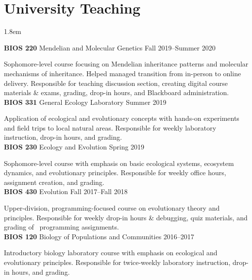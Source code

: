 \documentclass[]{article}
\begin{document}
\section{University Teaching}

\vspace{4mm}
\leftskip 1.8em

\textbf{BIOS 220} Mendelian and Molecular Genetics \hfill Fall 2019--Summer 2020
     
Sophomore-level course focusing on Mendelian inheritance patterns and molecular mechanisms of \linebreak inheritance. Helped managed transition from in-person to online delivery. Responsible for teaching discussion section, creating digital course materials \& exams, grading, drop-in hours, and Blackboard \linebreak administration. \href{https://ledelaney.org/teaching/genetics220/}{\faLink} \href{https://github.com/ledelaney/Genetics220}{\faGithub}\\
     
\textbf{BIOS 331} General Ecology Laboratory \hfill Summer 2019

Application of ecological and evolutionary concepts with hands-on experiments and field trips to local natural areas. Responsible for weekly laboratory instruction, drop-in hours, and grading. \href{https://github.com/ledelaney/GeneralEcologyMaterials}{\faGithub}\\
     
\textbf{BIOS 230} Ecology and Evolution \hfill Spring 2019

Sophomore-level course with emphasis on basic ecological systems, ecosystem dynamics, and \linebreak evolutionary principles. Responsible for weekly office hours, assignment creation, and grading.\\
     
\textbf{BIOS 430} Evolution \hfill Fall 2017--Fall 2018
     
Upper-division, programming-focused course on evolutionary theory and principles. Responsible for weekly drop-in hours \& debugging, quiz materials, and grading of \textcolor{light-gray}{\faRProject}\ programming assignments.\\

\textbf{BIOS 120} Biology of Populations and Communities \hfill 2016--2017
     
Introductory biology laboratory course with emphasis on ecological and evolutionary principles. \linebreak Responsible for twice-weekly laboratory instruction, drop-in hours, and grading.
\end{document}
